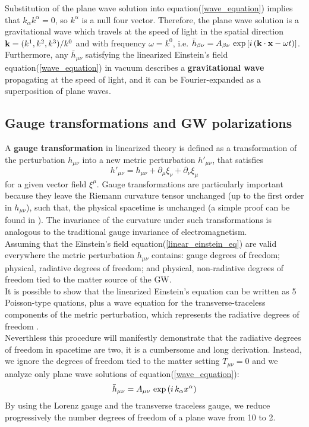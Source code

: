 Substitution of the plane wave solution into equation(\ref{wave_equation}) implies that $k_{\alpha} k^{\alpha} =0$, so $k^{\alpha}$ is a null four vector. 
Therefore, the plane wave solution is a gravitational wave which travels at the speed of light in the spatial direction $\vb{k} = (k^{1},k^{2},k^{3})/k^{0}$ and with frequency $\omega=k^{0} $, i.e. $\bar{h}_{\beta \nu} = A_{\beta \nu} \, \exp\qty[i\, (\vb{k} \cdot \vb{x} - \omega t)]$.
Furthermore, any $\bar{h}_{\mu \nu}$ satisfying the linearized Einstein's field equation(\ref{wave_equation}) in vacuum describes a \textbf{gravitational wave} propagating at the speed of light, and it can be Fourier-expanded as a superposition of plane waves.\\

\subsection{Gauge transformations and GW polarizations}
A \textbf{gauge transformation} in linearized theory is defined as a transformation of the perturbation $h_{\mu \nu}$ into a new metric perturbation $h'_{\mu \nu}$, that satisfies
\begin{equation}
\label{gauge_transf}
h' _{\mu \nu} = h_{\mu \nu} + \partial_\mu \xi _{\nu} + \partial_\nu \xi _{\mu}
\end{equation}
for a given vector field $\xi^\mu$.
Gauge transformations are particularly important because they leave the Riemann curvature tensor unchanged (up to the first order in $h_{\mu \nu}$), such that, the physical spacetime is unchanged (a simple proof can be found in \cite{carroll_spacetime_2003}). 
The invariance of the curvature under such transformations is analogous to the traditional gauge invariance of electromagnetism.\\
Assuming that the Einstein's field equation(\ref{linear_einstein_eq}) are valid everywhere the metric perturbation $h_{\mu \nu}$ contains: gauge degrees of freedom; physical, radiative degrees of freedom; and physical, non-radiative degrees of freedom tied to the matter source of the GW. \\
 It is possible to show that the linearized Einstein's equation can be written as 5 Poisson-type quations, plus a wave equation for the transverse-traceless components of the metric perturbation, which represents the radiative degrees of freedom \cite{flanagan_basics_2005,carroll_spacetime_2003}.\\
 Neverthless this procedure will manifestly demonstrate that the radiative degrees of freedom in spacetime are two, it is a cumbersome and long derivation.
Instead, we ignore the degrees of freedom tied to the matter setting $T_{\mu \nu} =0$ and we analyze only plane wave solutions of equation(\ref{wave_equation}):
\[
\bar{h}_{\mu \nu} = A_{\mu \nu} \, \exp\qty(i\, k_{\alpha} x^{\alpha})
\]
By using the Lorenz gauge and the transverse traceless gauge, we reduce progressively the number degrees of freedom of a plane wave from 10 to 2.\\

